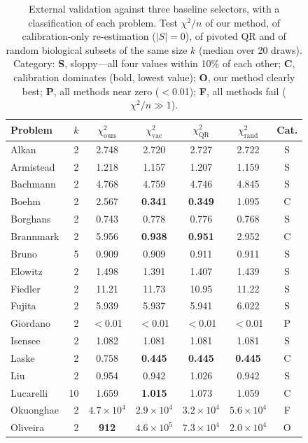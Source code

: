 \begin{table}[H]
\caption{External validation against three baseline selectors, with a classification of each problem. Test $\chi^2/n$ of our method, of calibration-only re-estimation ($|S|=0$), of pivoted QR and of random biological subsets of the same size $k$ (median over 20 draws). Category: \textbf{S}, sloppy---all four values within 10\% of each other; \textbf{C}, calibration dominates (bold, lowest value); \textbf{O}, our method clearly best; \textbf{P}, all methods near zero ($<$0.01); \textbf{F}, all methods fail ($\chi^2/n\gg1$).}
\label{tab:controls}
\centering
\small
\begin{tabular}{@{}lrccccc@{}}
\toprule
Problem & $k$ & $\chi^2_{\mathrm{ours}}$ & $\chi^2_{\mathrm{vac}}$ & $\chi^2_{\mathrm{QR}}$ & $\chi^2_{\mathrm{rand}}$ & Cat. \\
\midrule
Alkan        & 2  & 2.748 & 2.720 & 2.727 & 2.722 & S \\
Armistead    & 2  & 1.218 & 1.157 & 1.207 & 1.159 & S \\
Bachmann     & 2  & 4.768 & 4.759 & 4.746 & 4.845 & S \\
Boehm        & 2  & 2.567 & \textbf{0.341} & \textbf{0.349} & 1.095 & C \\
Borghans     & 2  & 0.743 & 0.778 & 0.776 & 0.768 & S \\
Brannmark    & 2  & 5.956 & \textbf{0.938} & \textbf{0.951} & 2.952 & C \\
Bruno        & 5  & 0.909 & 0.909 & 0.911 & 0.911 & S \\
Elowitz      & 2  & 1.498 & 1.391 & 1.407 & 1.439 & S \\
Fiedler      & 2  & 11.21 & 11.73 & 10.95 & 11.22 & S \\
Fujita       & 2  & 5.939 & 5.937 & 5.941 & 6.022 & S \\
Giordano     & 2  & $<$0.01 & $<$0.01 & $<$0.01 & $<$0.01 & P \\
Isensee      & 2  & 1.082 & 1.081 & 1.081 & 1.081 & S \\
Laske        & 2  & 0.758 & \textbf{0.445} & \textbf{0.445} & \textbf{0.445} & C \\
Liu          & 2  & 0.954 & 0.942 & 1.026 & 0.942 & S \\
Lucarelli    & 10 & 1.659 & \textbf{1.015} & 1.073 & 1.059 & C \\
Okuonghae    & 2  & $4.7\times10^4$ & $2.9\times10^4$ & $3.2\times10^4$ & $5.6\times10^4$ & F \\
Oliveira     & 2  & \textbf{912} & $4.6\times10^5$ & $7.3\times10^4$ & $2.0\times10^4$ & O \\

\end{tabular}
\end{table}

